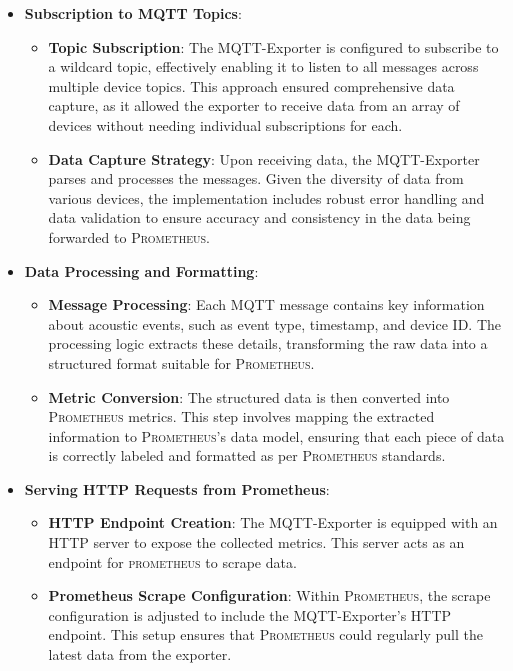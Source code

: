 \begin{itemize}
  \item \textbf{Subscription to MQTT Topics}: \begin{itemize}
          \item \textbf{Topic Subscription}: The MQTT-Exporter is configured to subscribe to a wildcard topic, effectively enabling it to listen to all messages across multiple device topics. This approach ensured comprehensive data capture, as it allowed the exporter to receive data from an array of devices without needing individual subscriptions for each.
          \item \textbf{Data Capture Strategy}: Upon receiving data, the MQTT-Exporter parses and processes the messages. Given the diversity of data from various devices, the implementation includes robust error handling and data validation to ensure accuracy and consistency in the data being forwarded to \textsc{Prometheus}.
        \end{itemize}
  \item \textbf{Data Processing and Formatting}: \begin{itemize}
          \item \textbf{Message Processing}: Each MQTT message contains key information about acoustic events, such as event type, timestamp, and device ID. The processing logic extracts these details, transforming the raw data into a structured format suitable for \textsc{Prometheus}.
          \item \textbf{Metric Conversion}: The structured data is then converted into \textsc{Prometheus} metrics. This step involves mapping the extracted information to \textsc{Prometheus}'s data model, ensuring that each piece of data is correctly labeled and formatted as per \textsc{Prometheus} standards.
        \end{itemize}
  \item \textbf{Serving HTTP Requests from Prometheus}: \begin{itemize}
          \item \textbf{HTTP Endpoint Creation}: The MQTT-Exporter is equipped with an HTTP server to expose the collected metrics. This server acts as an endpoint for \textsc{prometheus} to scrape data.
          \item \textbf{Prometheus Scrape Configuration}: Within \textsc{Prometheus}, the scrape configuration is adjusted to include the MQTT-Exporter's HTTP endpoint. This setup ensures that \textsc{Prometheus} could regularly pull the latest data from the exporter.

\end{itemize}
\end{itemize}
